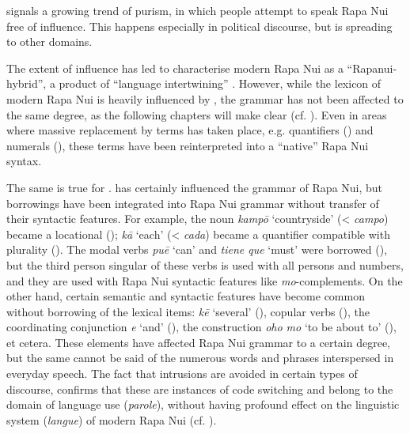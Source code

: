 \citet{Makihara1998,Makihara2009} signals a growing trend of purism, in which people attempt to speak Rapa Nui free of  influence. This happens especially in political discourse, but is spreading to other domains.

The extent of  influence has led \citet[47]{Fischer1996Review} to characterise modern Rapa Nui as a “Rapanui- hybrid”, a product of “language intertwining” \citep[151]{Fischer2008Reversing}. However, while the lexicon of modern Rapa Nui is heavily influenced by , the grammar has not been affected to the same degree, as the following chapters will make clear (cf. \citealt[194]{Makihara2001Adaptation}). Even in areas where massive replacement by  terms has taken place, e.g. quantifiers () and numerals (), these terms have been reinterpreted into a “native” Rapa Nui syntax.

The same is true for .  has certainly influenced the grammar of Rapa Nui, but  borrowings have been integrated into Rapa Nui grammar without transfer of their syntactic features. For example, the  noun \textit{kampō} ‘countryside’ ({\textless} \textit{campo}) became a locational (); \textit{kā} ‘each’ ({\textless} \textit{cada}) became a quantifier compatible with plurality (). The modal verbs \textit{puē} ‘can’ and \textit{tiene que} ‘must’ were borrowed (), but the third person singular of these verbs is used with all persons and numbers, and they are used with Rapa Nui syntactic features like \textit{mo}{}-complements. On the other hand, certain  semantic and syntactic features have become common without borrowing of the lexical items: \textit{kē} ‘several’ (), copular verbs (), the coordinating conjunction \textit{{\ꞌ}e} ‘and’ (), the construction \textit{oho mo} ‘to be about to’ (), et cetera. These elements have affected Rapa Nui grammar to a certain degree, but the same cannot be said of the numerous  words and phrases interspersed in everyday speech. The fact that  intrusions are avoided in certain types of discourse, confirms that these are instances of code switching and belong to the domain of language use (\textit{parole}), without having profound effect on the linguistic system (\textit{langue}) of modern Rapa Nui (cf. \citealt[193]{Makihara2001Adaptation}).

